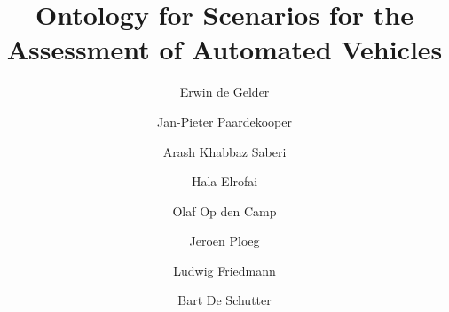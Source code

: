 \documentclass[3p,onecolumn,authoryear]{elsarticle}  %
\author[1,2]{Erwin de Gelder\corref{cor1}}
\author[1,3]{Jan-Pieter Paardekooper}
\author[1]{Arash Khabbaz Saberi}
\author[1]{Hala Elrofai}
\author[1]{Olaf Op den Camp}
\author[4,5]{Jeroen Ploeg}
\author[6]{Ludwig Friedmann}
\author[2]{Bart De Schutter}
\theoremstyle{plain}
\theoremstyle{remark}\newtheorem{remarkenv}{Remark}        %
\begin{document}
\title{Ontology for Scenarios for the Assessment of Automated Vehicles}



\maketitle








%






%



%
\end{document}
